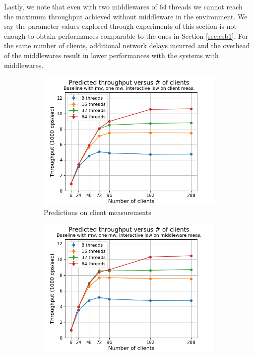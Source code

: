 \documentclass[11pt,a4paper]{article}
\begin{document}
\par Lastly, we note that even with two middlewares of 64 threads we cannot reach the maximum throughput achieved without middleware in the environment. We say the parameter values explored through experiments of this section is not enough to obtain performances comparable to the ones in Section \ref{sec:csb1}. For the same number of clients, additional network delays incurred and the overhead of the middlewares result in lower performances with the systems with middlewares.
\begin{figure}[h!]
\centering
\begin{subfigure}{.5\textwidth}
  \centering
  \includegraphics[width=1.0\linewidth,trim={5px 0px 20px 0px},clip]{img/plot/mwb2-wo-tp_law_cli.png}
  \caption{Predictions on client measurements}
  \label{fig:mwb2-wo-tp_law_cli}
\end{subfigure}%
\begin{subfigure}{.5\textwidth}
  \centering
  \includegraphics[width=1.0\linewidth,trim={5px 0px 20px 0px},clip]{img/plot/mwb2-wo-tp_law_mw.png}

\end{subfigure}
\end{figure}
\end{document}
